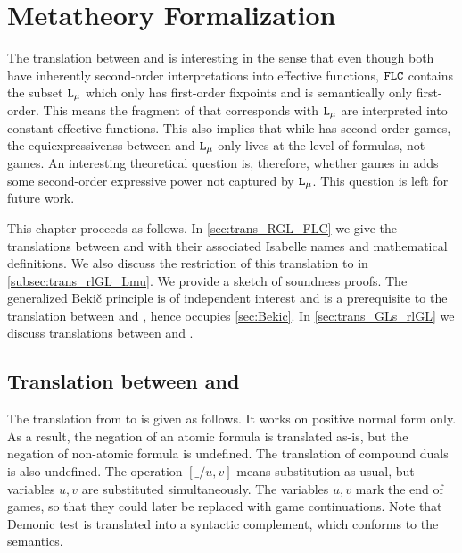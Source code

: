 
\chapter{Metatheory Formalization}
\label{chp:meta_fml}

The translation between \RGL{} and \FLC{} is interesting in the sense that even though both have inherently second-order interpretations into effective functions, $\texttt{FLC}{}$ contains the subset $\texttt{L}_\mu{}$ which only has first-order fixpoints and is semantically only first-order. This means the fragment of \RGL{} that corresponds with $\texttt{L}_\mu{}$ are interpreted into constant effective functions. This also implies that while \GLs{} has second-order games, the equiexpressivenss between \GLs{} and $\texttt{L}_\mu{}$ only lives at the level of formulas, not games. An interesting theoretical question is, therefore, whether games in \GLs{} adds some second-order expressive power not captured by $\texttt{L}_\mu{}$. This question is left for future work.

This chapter proceeds as follows. In \autoref{sec:trans_RGL_FLC} we give the translations between \RGL{} and \FLC{} with their associated Isabelle names and mathematical definitions. We also discuss the restriction of this translation to \rlGL{} in \autoref{subsec:trans_rlGL_Lmu}. We provide a sketch of soundness proofs. The generalized Beki\v{c} principle is of independent interest and is a prerequisite to the translation between \GLs{} and \rlGL{}, hence occupies \autoref{sec:Bekic}. In \autoref{sec:trans_GLs_rlGL} we discuss translations between \GLs{} and \rlGL{}.

\section{Translation between \RGL{} and \FLC{}}
\label{sec:trans_RGL_FLC}

The translation from \RGL{} to \FLC{} is given as follows. It works on positive normal form only. As a result, the negation of an atomic formula is translated as-is, but the negation of non-atomic formula is undefined. The translation of compound duals is also undefined. The operation $[\_/u,v]$ means substitution as usual, but variables $u,v$ are substituted simultaneously. The variables $u,v$ mark the end of games, so that they could later be replaced with game continuations. Note that Demonic test is translated into a syntactic complement, which conforms to the semantics.

